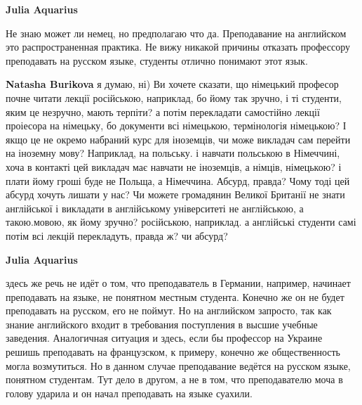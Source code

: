 \begin{itemize}
\begin{itemize}
\textbf{Julia Aquarius} 

Не знаю может ли немец, но предполагаю что да. Преподавание на английском это
распространенная практика. Не вижу никакой причины отказать профессору
преподавать на русском языке, студенты отлично понимают этот язык.

 
\textbf{Natasha Burikova} я думаю, ні) Ви хочете сказати, що німецький професор
почне читати лекції російською, наприклад, бо йому так зручно, і ті студенти,
яким це незручно, мають терпіти? а потім перекладати самостійно лекції
проіесора на німецьку, бо документи всі німецькою, термінологія німецькою? І
якщо це не окремо набраний курс для іноземців, чи може викладач сам перейти на
іноземну мову? Наприклад, на польську. і навчати польською в Німеччині, хоча в
контакті цей викладач має навчати не іноземців, а німців, німецькою? і плати
йому гроші буде не Польща, а Німеччина. Абсурд, правда? Чому тоді цей абсурд
хочуть лишати у нас? Чи можете громадянин Великої Британії не знати англійської
і викладати в англійському університеті не англійською, а такою.мовою, як йому
зручно? російською, наприклад. а англійські студенти самі потім всі лекцій
перекладуть, правда ж? чи абсурд?

 
\textbf{Julia Aquarius} 

здесь же речь не идёт о том, что преподаватель в Германии, например, начинает
преподавать на языке, не понятном местным студента. Конечно же он не будет
преподавать на русском, его не поймут. Но на английском запросто, так как
знание английского входит в требования поступления в высшие учебные заведения.
Аналогичная ситуация и здесь, если бы профессор на Украине решишь преподавать
на французском, к примеру, конечно же общественность могла возмутиться. Но в
данном случае преподавание ведётся на русском языке, понятном студентам. Тут
дело в другом, а не в том, что преподавателю моча в голову ударила и он начал
преподавать на языке суахили.

 

\end{itemize}
\end{itemize}
